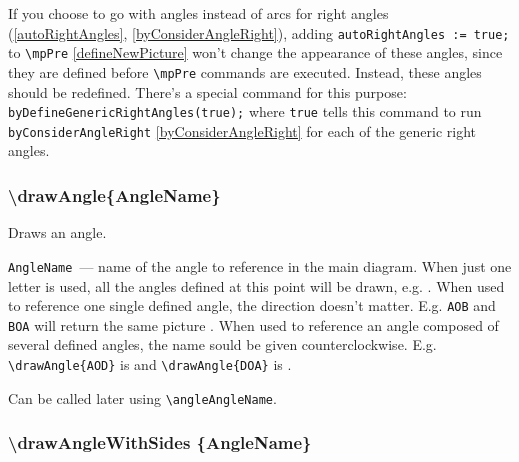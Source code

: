 	If you choose to go with angles instead of arcs for right angles (\ref{autoRightAngles}, \ref{byConsiderAngleRight}), adding \texttt{autoRightAngles := true;} to \texttt{\textbackslash mpPre} \ref{defineNewPicture} won't change the appearance of these angles, since they are defined before \texttt{\textbackslash mpPre} commands are executed. Instead, these angles should be redefined. There's a special command for this purpose: \texttt{byDefineGenericRightAngles(true);} where \texttt{true} tells this command to run \texttt{byConsiderAngleRight} \ref{byConsiderAngleRight} for each of the generic right angles.

\subsubsection{\textbackslash drawAngle\{AngleName\}}\label{drawAngle}

	Draws an angle.
	

	\texttt{AngleName}~— name of the angle to reference in the main diagram. 
	When just one letter is used, all the angles defined at this point will be drawn, e.g. . When used to reference one single defined angle, the direction doesn't matter. 
	E.g. \texttt{AOB} and \texttt{BOA} will return the same picture . 
	When used to reference an angle composed of several defined angles, the name sould be given counterclockwise. 
	E.g. \texttt{\textbackslash drawAngle\{AOD\}} is  and \texttt{\textbackslash drawAngle\{DOA\}} is .
	
	Can be called later using \texttt{\textbackslash angleAngleName}.
	
\subsubsection{\textbackslash drawAngleWithSides \{AngleName\}}


